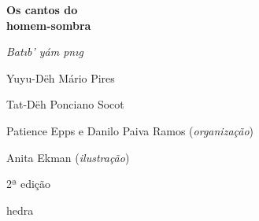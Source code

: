 




\begingroup\thispagestyle{empty}\vspace*{.05\textheight} 

              \formular
              \huge
              \noindent
              \textbf{Os cantos do\\ homem-sombra}

              \vspace{0.3em}
              
              \large
              \noindent
              \textit{Bat\i{}b’ yám p\I{}n\i{}g}
              
              \vspace{3em}

              \Large\noindent
              Yuyu-Dëh Mário Pires

              \noindent Tat-Dëh Ponciano Socot
              
              \vspace{3em}
              
              \newfontfamily{}
              {\selectfont\garamond\small\noindent Patience Epps e Danilo Paiva Ramos (\textit{organização})}

              {\selectfont\garamond\small\noindent Anita Ekman (\textit{ilustração})}

              \bigskip

              \noindent
              {\selectfont\garamond\small\noindent 2ª edição}

              \vfill

              \newfontfamily{}
              {\noindent\fontsize{30}{40}\selectfont \timesnewroman hedra}



\endgroup
\pagebreak
